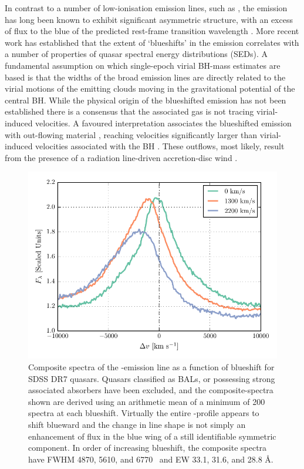 In contrast to a number of low-ionisation emission lines, such as , the  emission has long been known to exhibit significant asymmetric structure, with an excess of flux to the blue of the predicted rest-frame transition wavelength \citep{gaskell82}. 
More recent work \citep[e.g.][]{sulentic00a, richards11} has established that the extent of `blueshifts' in the  emission correlates with a number of properties of quasar spectral energy distributions (SEDs). 
A fundamental assumption on which single-epoch virial BH-mass estimates are based is that the widths of the broad emission lines are directly related to the virial motions of the emitting clouds moving in the gravitational potential of the central BH. 
While the physical origin of the blueshifted emission has not been established there is a consensus that the associated gas is not tracing virial-induced velocities.  
A favoured interpretation associates the blueshifted emission with out-flowing material \citep[see][for a recent review]{netzer15}, reaching velocities significantly larger than virial-induced velocities associated with the BH \citep[e.g.][]{sulentic07, richards11}.
These outflows, most likely, result from the presence of a radiation line-driven accretion-disc wind \citep[e.g.][]{konigl94, murray95, proga00, everett05, gallagher15,higginbottom15}.  

\begin{figure}[h!]
    \centering
    \includegraphics[width=0.9\linewidth]{figures/chapter03/civ_composites.pdf}
    \caption[{Composite spectra of the -emission line as a function of  blueshift for SDSS DR7 quasars.}]{Composite spectra of the -emission line as a function of  blueshift for SDSS DR7 quasars. Quasars classified as BALs, or possessing strong associated absorbers have been excluded, and the composite-spectra shown are derived using an arithmetic mean of a minimum of 200 spectra at each blueshift. Virtually the entire -profile appears to shift blueward and the change in line shape is not simply an enhancement of flux in the blue wing of a still identifiable symmetric component. In order of increasing  blueshift, the composite spectra have FWHM 4870, 5610, and 6770 \kms\, and EW 33.1, 31.6, and 28.8 \AA.}
    \label{fig:civ_composites}
\end{figure}

